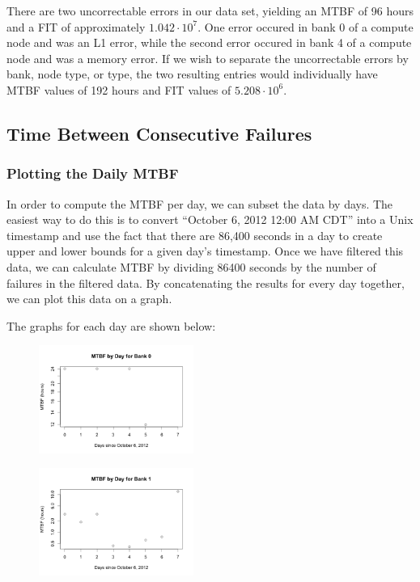 \begin{t able}[t]
There are two uncorrectable errors in our data set, yielding an MTBF of 96 hours and a FIT of approximately $1.042 \cdot 10^7$.  One error occured in bank 0 of a compute node and was an L1 error, while the second error occured in bank 4 of a compute node and was a memory error.  If we wish to separate the uncorrectable errors by bank, node type, or type, the two resulting entries would individually have MTBF values of 192 hours and FIT values of $5.208 \cdot 10^6$.

\subsection{Time Between Consecutive Failures}
\subsubsection{Plotting the Daily MTBF}

In order to compute the MTBF per day, we can subset the data by days.  The easiest way to do this is to convert ``October 6, 2012 12:00 AM CDT'' into a Unix timestamp and use the fact that there are 86,400 seconds in a day to create upper and lower bounds for a given day's timestamp.  Once we have filtered this data, we can calculate MTBF by dividing 86400 seconds by the number of failures in the filtered data.  By concatenating the results for every day together, we can plot this data on a graph.

The graphs for each day are shown below:

\begin{figure}
\centering
\includegraphics[width=0.45\textwidth]{images/mtbf_0.png}
\end{figure}

\begin{figure}
\centering
\includegraphics[width=0.45\textwidth]{images/mtbf_1.png}
\end{figure}


\end{t able}
